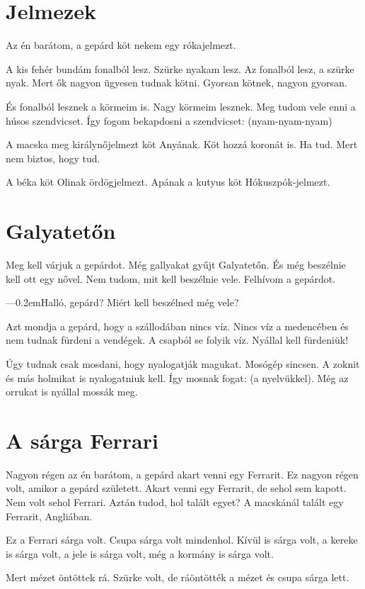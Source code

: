 \documentclass[12pt]{memoir}
\def\dash{---\kern 0.2em}
\begin{document}
\section*{Jelmezek}
Az én barátom, a gepárd köt nekem egy rókajelmezt.

A kis fehér bundám fonalból lesz. Szürke nyakam lesz. Az fonalból lesz, a
szürke nyak. Mert ők nagyon ügyesen tudnak kötni. Gyorsan kötnek, nagyon
gyorsan.

És fonalból lesznek a körmeim is. Nagy körmeim lesznek. Meg tudom vele enni a
húsos szendvicset. Így fogom bekapdosni a szendvicset: (nyam-nyam-nyam)

A macska meg királynőjelmezt köt Anyának. Köt hozzá koronát is. Ha tud. Mert
nem biztos, hogy tud.

A béka köt Olinak ördögjelmezt. Apának a kutyus köt Hókuszpók-jelmezt.


\section*{Galyatetőn}
Meg kell várjuk a gepárdot. Még gallyakat gyűjt Galyatetőn. És még beszélnie
kell ott egy nővel. Nem tudom, mit kell beszélnie vele. Felhívom a gepárdot.

\dash Halló, gepárd? Miért kell beszélned még vele?

Azt mondja a gepárd, hogy a szállodában nincs víz. Nincs víz a medencében és
nem tudnak fürdeni a vendégek. A csapból se folyik víz. Nyállal kell fürdeniük!

Úgy tudnak csak mosdani, hogy nyalogatják magukat. Mosógép sincsen. A zoknit és
más holmikat is nyalogatniuk kell. Így mosnak fogat: (a nyelvükkel). Még az
orrukat is nyállal mossák meg.


\section*{A sárga Ferrari}
Nagyon régen az én barátom, a gepárd akart venni egy Ferrarit. Ez nagyon régen
volt, amikor a gepárd született. Akart venni egy Ferrarit, de sehol sem kapott.
Nem volt sehol Ferrari. Aztán tudod, hol talált egyet? A macskánál talált egy
Ferrarit, Angliában.

Ez a Ferrari sárga volt. Csupa sárga volt mindenhol. Kívül is sárga volt, a
kereke is sárga volt, a jele is sárga volt, még a kormány is sárga volt.

Mert mézet öntöttek rá. Szürke volt, de ráöntötték a mézet és csupa sárga lett.
\end{document}
